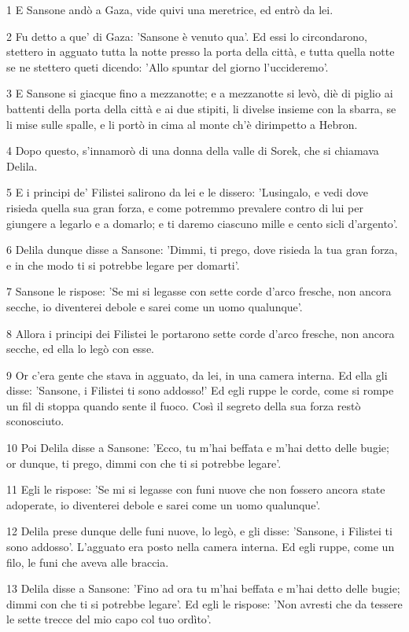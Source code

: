 \par 1 E Sansone andò a Gaza, vide quivi una meretrice, ed entrò da lei.
\par 2 Fu detto a que' di Gaza: 'Sansone è venuto qua'. Ed essi lo circondarono, stettero in agguato tutta la notte presso la porta della città, e tutta quella notte se ne stettero queti dicendo: 'Allo spuntar del giorno l'uccideremo'.
\par 3 E Sansone si giacque fino a mezzanotte; e a mezzanotte si levò, diè di piglio ai battenti della porta della città e ai due stipiti, li divelse insieme con la sbarra, se li mise sulle spalle, e li portò in cima al monte ch'è dirimpetto a Hebron.
\par 4 Dopo questo, s'innamorò di una donna della valle di Sorek, che si chiamava Delila.
\par 5 E i principi de' Filistei salirono da lei e le dissero: 'Lusingalo, e vedi dove risieda quella sua gran forza, e come potremmo prevalere contro di lui per giungere a legarlo e a domarlo; e ti daremo ciascuno mille e cento sicli d'argento'.
\par 6 Delila dunque disse a Sansone: 'Dimmi, ti prego, dove risieda la tua gran forza, e in che modo ti si potrebbe legare per domarti'.
\par 7 Sansone le rispose: 'Se mi si legasse con sette corde d'arco fresche, non ancora secche, io diventerei debole e sarei come un uomo qualunque'.
\par 8 Allora i principi dei Filistei le portarono sette corde d'arco fresche, non ancora secche, ed ella lo legò con esse.
\par 9 Or c'era gente che stava in agguato, da lei, in una camera interna. Ed ella gli disse: 'Sansone, i Filistei ti sono addosso!' Ed egli ruppe le corde, come si rompe un fil di stoppa quando sente il fuoco. Così il segreto della sua forza restò sconosciuto.
\par 10 Poi Delila disse a Sansone: 'Ecco, tu m'hai beffata e m'hai detto delle bugie; or dunque, ti prego, dimmi con che ti si potrebbe legare'.
\par 11 Egli le rispose: 'Se mi si legasse con funi nuove che non fossero ancora state adoperate, io diventerei debole e sarei come un uomo qualunque'.
\par 12 Delila prese dunque delle funi nuove, lo legò, e gli disse: 'Sansone, i Filistei ti sono addosso'. L'agguato era posto nella camera interna. Ed egli ruppe, come un filo, le funi che aveva alle braccia.
\par 13 Delila disse a Sansone: 'Fino ad ora tu m'hai beffata e m'hai detto delle bugie; dimmi con che ti si potrebbe legare'. Ed egli le rispose: 'Non avresti che da tessere le sette trecce del mio capo col tuo ordìto'.
